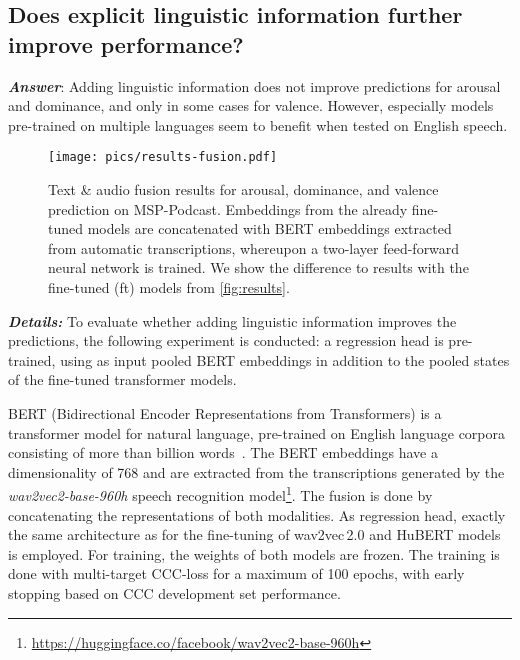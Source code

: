 \documentclass{article}
\newcommand\msppodcast{\mbox{MSP-Podcast}}
\newcommand{\wtov}{wav2vec\,2.0}
\newcommand{\hubert}{HuBERT}
\begin{document}
\subsection{Does explicit linguistic information further improve performance?}
\label{subsec:fusion}

\emph{\textbf{Answer}}:
Adding linguistic information does not improve predictions for arousal and dominance,
and only in some cases for valence.
However, especially models pre-trained on multiple languages seem to benefit when tested on English speech.

\begin{figure}[t]
    \centering
    \texttt{[image: pics/results-fusion.pdf]}
    \caption{
        Text \& audio fusion results for arousal, dominance, and valence prediction on {\msppodcast}.
        Embeddings from the already fine-tuned models are concatenated with BERT embeddings extracted from automatic transcriptions, whereupon a two-layer feed-forward neural network is trained. 
        We show the difference to results with the fine-tuned (ft) models from \cref{fig:results}.
    }
    \label{fig:fusion}
\end{figure}

\noindent
\emph{\textbf{Details:}}
To evaluate whether adding linguistic information improves the predictions, the following experiment is conducted: a regression head is pre-trained, using as input pooled BERT embeddings in addition to the pooled states of the fine-tuned transformer models.

BERT (Bidirectional Encoder Representations from Transformers) is a transformer model for natural language, pre-trained on English language corpora consisting of more than  billion words~\cite{devlin2019bert}. 
The BERT embeddings have a dimensionality of 768 and are extracted from the transcriptions generated by the \emph{wav2vec2-base-960h} speech recognition model\footnote{\url{https://huggingface.co/facebook/wav2vec2-base-960h}}.
The fusion is done by concatenating the representations of both modalities.
As regression head, exactly the same architecture as for the fine-tuning of {\wtov} and {\hubert} models is employed.
For training, the weights of both models are frozen. 
The training is done with multi-target \ac{CCC}-loss for a maximum of 100 epochs, with early stopping based on \ac{CCC} development set performance. 
\end{document}
